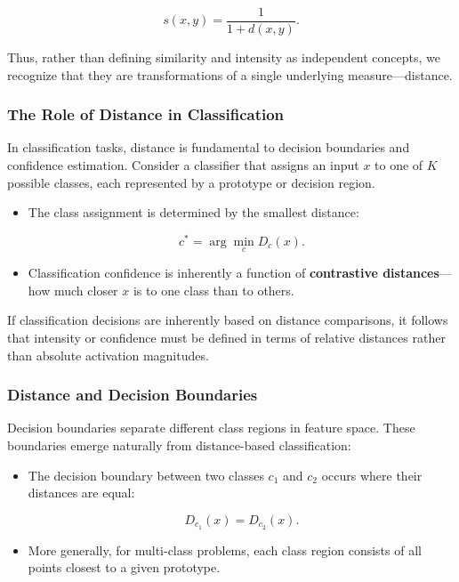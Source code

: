 \[
s(x, y) = \frac{1}{1 + d(x, y)}.
\]

Thus, rather than defining similarity and intensity as independent concepts, we recognize that they are transformations of a single underlying measure—distance.

\subsubsection{The Role of Distance in Classification}

In classification tasks, distance is fundamental to decision boundaries and confidence estimation. Consider a classifier that assigns an input \( x \) to one of \( K \) possible classes, each represented by a prototype or decision region.

\begin{itemize}
    \item The class assignment is determined by the smallest distance:
    
    \[
    c^* = \arg\min_{c} D_c(x).
    \]

    \item Classification confidence is inherently a function of \textbf{contrastive distances}—how much closer \( x \) is to one class than to others.

\end{itemize}

If classification decisions are inherently based on distance comparisons, it follows that intensity or confidence must be defined in terms of relative distances rather than absolute activation magnitudes.

\subsubsection{Distance and Decision Boundaries}

Decision boundaries separate different class regions in feature space. These boundaries emerge naturally from distance-based classification:

\begin{itemize}
    \item The decision boundary between two classes \( c_1 \) and \( c_2 \) occurs where their distances are equal:

    \[
    D_{c_1}(x) = D_{c_2}(x).
    \]

    \item More generally, for multi-class problems, each class region consists of all points closest to a given prototype.
\end{itemize}

